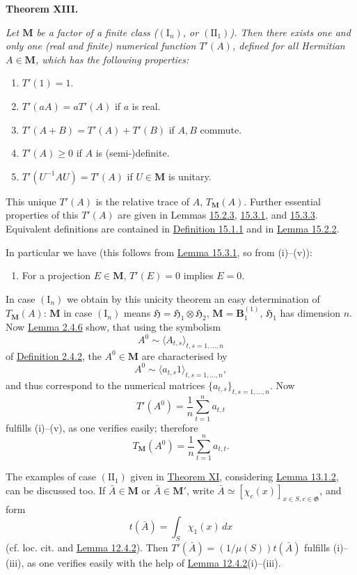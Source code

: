 \documentclass[12pt,b5paper,twoside]{article}
\newcommand{\Hspace}{\mathfrak H}
\newcommand{\M}{\mathbf M}
\newcommand{\B}{\mathbf B}
\newcommand{\MainTheorem}[1]{%
  \par\smallskip\noindent\phantomsection\label{thm:#1}\textbf{Theorem #1.}\enspace
}
\newcommand{\defref}[1]{\hyperref[def:#1]{Definition #1}}
\newcommand{\lemref}[1]{\hyperref[lem:#1]{Lemma #1}}
\newcommand{\thmref}[1]{\hyperref[thm:#1]{Theorem #1}}
\begin{document}
\MainTheorem{XIII}
{\itshape Let \(\M\) be a factor of a finite class
(\((\mathrm I_n)\), or \((\mathrm{II}_1)\)). Then there exists one and only
one (real and finite) numerical function \(T'(A)\), defined for all Hermitian
\(A\in\M\), which has the following properties:
\begin{enumerate}[label=(\roman*)]
\item \(T'(1)=1\).
\item \(T'(aA)=aT'(A)\) if \(a\) is real.
\item \(T'(A+B)=T'(A)+T'(B)\) if \(A,B\) commute.
\item \(T'(A)\geq0\) if \(A\) is (semi-)definite.
\item \(T'(U^{-1}AU)=T'(A)\) if \(U\in\M\) is unitary.
\end{enumerate}
This unique \(T'(A)\) is the relative trace of \(A\), \(T_{\M}(A)\).
Further essential properties of this \(T'(A)\) are given in Lemmas
\hyperref[lem:15.2.3]{15.2.3}, \hyperref[lem:15.3.1]{15.3.1}, and
\hyperref[lem:15.3.3]{15.3.3}. Equivalent
definitions are contained in \defref{15.1.1} and in \lemref{15.2.2}.

In particular we have (this follows from \lemref{15.3.1}, so from (i)--(v)):
\begin{enumerate}[label=(\roman*),start=6]
\item For a projection \(E\in\M\), \(T'(E)=0\) implies \(E=0\).
\end{enumerate}}

In case \((\mathrm I_n)\) we obtain by this unicity theorem an easy
determination of \(T_{\M}(A)\): \(\M\) in case \((\mathrm I_n)\) means
\(\Hspace=\Hspace_1\otimes\Hspace_2\), \(\M=\B_1^{(1)}\),
 \(\Hspace_1\) has dimension \(n\). Now
 \hyperref[lem:2.4.6]{Lemma 2.4.6} show, that using the
symbolism
\[
A^0\sim\langle A_{t,s}\rangle_{t,s=1,\ldots,n}
\]
of \defref{2.4.2}, the \(A^0\in\M\) are characterised by
\[
A^0\sim\langle a_{t,s}1\rangle_{t,s=1,\ldots,n},
\]
and thus correspond to the numerical matrices
\(\{a_{t,s}\}_{t,s=1,\ldots,n}\). Now
\[
T'(A^0)=\frac1n\sum_{t=1}^na_{t,t}
\]
fulfills (i)--(v), as one verifies easily; therefore
\[
T_{\M}(A^0)=\frac1n\sum_{t=1}^na_{t,t}.
\]

The examples of case \((\mathrm{II}_1)\) given in \thmref{XI}, considering
\lemref{13.1.2}, can be discussed too. If \(\bar A\in\M\) or
\(\bar A\in\M'\), write
\(\bar A\simeq[\chi_c(x)]_{x\in S,c\in\mathfrak G}\), and form
\[
t(\bar A)=\int_S\chi_1(x)\,dx
\]
(cf. loc. cit. and \lemref{12.4.2}). Then
\(T'(\bar A)=(1/\mu(S))t(\bar A)\) fulfills (i)--(iii), as one verifies
easily with the help of \lemref{12.4.2}(i)--(iii).
\end{document}
